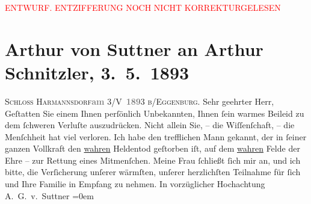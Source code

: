 
\begin{center}
            \textcolor{red}{ENTWURF. ENTZIFFERUNG NOCH NICHT KORREKTURGELESEN}
                      \end{center}
            
               \section[Arthur von Suttner an Arthur Schnitzler, 3. 5. 1893]{ Arthur von Suttner an Arthur Schnitzler,
                    3. 5. 1893}\nopagebreak{}\rehead{ }\begin{ledgroupsized}[t]{13cm}\normalsize\beginnumbering{} \toendnotes[C]{\smallbreak\pagebreak[2]} 
\toendnotes[C]{\smallbreak}\pstart
           \noindent{}{\pb}\textsc{Schloss Harmannsdorf}\hfill \textcolor{gray}{\textbf{am}}{ }3/V \textcolor{gray}{\textbf{189}}3\pend
           \pstart
           \textsc{b/Eggenburg.}\pend
           \pstart{}Sehr geehrter Herr,\pend\pstart
           Geſtatten Sie einem Ihnen perſönlich Unbekannten, Ihnen ſein warmes Beileid zu
                    dem ſchweren Verluſte auszudrücken. Nicht allein Sie, – die Wiſſenſchaft, – die
                    Menſchheit hat viel verloren. Ich habe den trefflichen Mann gekannt, der in ſeiner ganzen
                    Vollkraft den \uline{wahren} Heldentod geſtorben iſt,
                    auf dem \uline{wahren} Felde der Ehre – zur Rettung
                    eines Mitmenſchen.\pend
           \pstart
           Meine Frau ſchließt ſich
                    mir an, und ich bitte, die Verſicherung unſerer wärmſten, unſerer herzlichſten
                        {\pb}Teilnahme für ſich und Ihre
                    Familie in Empfang zu nehmen.\pend
           \pstart
           In vorzüglicher Hochachtung{\\[\baselineskip]}\spacefill\mbox{A. G. v. Suttner}\pend
           \leftskip=0em{}\endnumbering{}\end{ledgroupsized}  \newcommand{\dateiname}{L00209}\newcommand{\titel}{Arthur von Suttner an Arthur Schnitzler, 3. 5. 1893}\newcommand{\editorInnen}{Martin Anton Müller und Gerd-Hermann Susen}
      